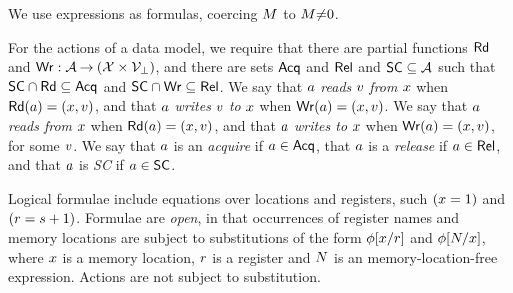 We use expressions as formulas, coercing $M$ to $M{\neq}0$.

For the actions of a data model, we require that
  there are partial functions $\mathsf{Rd}$ and
  $\mathsf{Wr}: \mathcal{A} \mathbin\rightarrow (\mathcal{X} \times \mathcal{V}_\bot)$, and
  there are sets $\mathsf{Acq}$ and $\mathsf{Rel}$ and $\mathsf{SC} \subseteq\mathcal{A}$ such that
  $\mathsf{SC}\cap\mathsf{Rd}\subseteq\mathsf{Acq}$ and
  $\mathsf{SC}\cap\mathsf{Wr}\subseteq\mathsf{Rel}$. %
%
We say that $a$ \emph{reads} $v$ \emph{from} $x$ when
$\mathsf{Rd}(a) = (x,v)$, and that $a$ \emph{writes} $v$
\emph{to} $x$ when $\mathsf{Wr}(a) = (x,v)$.
We say that $a$ \emph{reads from} $x$ when
$\mathsf{Rd}(a) = (x,v)$, and that $a$ \emph{writes to}
$x$ when $\mathsf{Wr}(a) = (x,v)$, for some $v$. %
%
%
We say that $a$ is an \emph{acquire} if $a\in\mathsf{Acq}$, that $a$
is a \emph{release} if $a\in\mathsf{Rel}$, and that $a$ is \emph{SC} if $a\in\mathsf{SC}$.  



Logical formulae include equations over locations and registers, such
$(x=1)$ and $(r=s+1)$.  Formulae are \emph{open}, in that
occurrences of register names and memory locations are subject to
substitutions of the form $\phi[x/r]$ and $\phi[N/x]$,
where $x$ is a memory location, $r$ is a register and $N$ is an
memory-location-free expression.  Actions are not subject to substitution.


